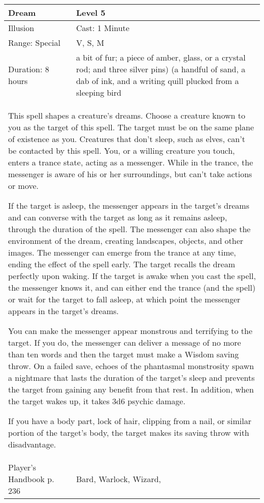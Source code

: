 \documentclass[11pt]{report}
\begin{document}
\begin{table}[H]
	\begin{tabular}{||p{6cm}|p{6cm}||}
		\hline\hline
		\bf{Dream} & Level 5\\ \hline
		Illusion & Cast: 1 Minute\\ \hline
		Range: Special & V, S, M \\ \hline
		Duration: 8 hours & a bit of fur; a piece of amber, glass, or a crystal rod; and three silver pins) (a handful of sand, a dab of ink, and a writing quill plucked from a sleeping bird\\ \hline
		\multicolumn{2}{||p{12cm}||}{This spell shapes a creature’s dreams. 
Choose a creature known to you as the target of this spell. The target must be on the same plane of existence as you. Creatures that don’t sleep, such as elves, can’t be contacted by this spell. You, or a willing creature you touch, enters a trance state, acting as a messenger. While in the trance, the messenger is aware of his or her surroundings, but can’t take actions or move. 

If the target is asleep, the messenger appears in the target’s dreams and can converse with the target as long as it remains asleep, through the duration of the spell. The messenger can also shape the environment of the dream, creating landscapes, objects, and other images. The messenger can emerge from the trance at any time, ending the effect of the spell early. The target recalls the dream perfectly upon waking. If the target is awake when you cast the spell, the messenger knows it, and can either end the trance (and the spell) or wait for the target to fall asleep, at which point the messenger appears in the target’s dreams. 

You can make the messenger appear monstrous and terrifying to the target. If you do, the messenger can deliver a message of no more than ten words and then the target must make a Wisdom saving throw. On a failed save, echoes of the phantasmal monstrosity spawn a nightmare that lasts the duration of the target’s sleep and prevents the target from gaining any benefit from that rest. In addition, when the target wakes up, it takes 3d6 psychic damage. 

If you have a body part, lock of hair, clipping from a nail, or similar portion of the target’s body, the target makes its saving throw with disadvantage.}\\ \hline
Player's Handbook p. 236 & Bard, Warlock, Wizard, \\ \hline\hline
	\end{tabular}
\end{table}
\end{document}
